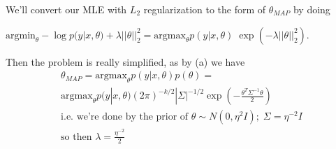 %
%
\begin{answer}
We'll convert our MLE with $L_2$ regularization to the form of $\theta_{MAP}$ by doing 

$\text{argmin}_\theta - \log p(y | x, \theta) + \lambda ||\theta||_2^2 = \text{argmax}_\theta p(y | x, \theta) \; \exp(- \lambda || \theta ||_2^2)$.

Then the problem is really simplified, as by (a) we have
\begin{align*}
\theta_{MAP} = \text{argmax}_\theta p(y | x, \theta) p(\theta) =
\\
\text{argmax}_\theta p(y | x, \theta) (2\pi)^{-k/2} |\Sigma|^{-1/2} \exp( - \frac{\theta^T \Sigma^{-1} \theta}{2})
\\
\text{i.e. we're done by the prior of } \theta \sim N(0, \eta^2 I);\; \Sigma = \eta^{-2}I
\\
\text{so then } \lambda = \frac{\eta^{-2}}{2}
\end{align*}
\end{answer}
%
